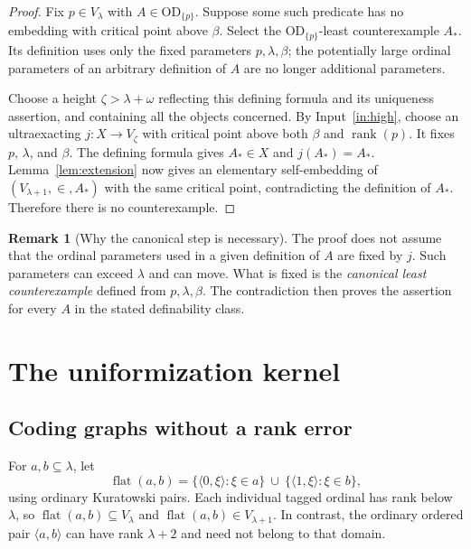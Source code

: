 \documentclass[11pt,letterpaper]{article}
\theoremstyle{definition}
\newtheorem{remark}[definition]{Remark}
\numberwithin{equation}{section}
\newcommand{\OD}{\mathrm{OD}}
\newcommand{\rank}{\operatorname{rank}}
\newcommand{\flatcode}[2]{\operatorname{flat}(#1,#2)}
\newcommand{\ODone}[1]{\OD_{\{#1\}}}
\begin{document}
\begin{proof}
Fix $p\in V_\lambda$ with $A\in\ODone{p}$. Suppose some such predicate has no embedding with critical point above $\beta$. Select the $\ODone{p}$-least counterexample $A_*$. Its definition uses only the fixed parameters $p,\lambda,\beta$; the potentially large ordinal parameters of an arbitrary definition of $A$ are no longer additional parameters.

Choose a height $\zeta>\lambda+\omega$ reflecting this defining formula and its uniqueness assertion, and containing all the objects concerned. By Input~\ref{in:high}, choose an ultraexacting $j:X\to V_\zeta$ with critical point above both $\beta$ and $\rank(p)$. It fixes $p$, $\lambda$, and $\beta$. The defining formula gives $A_*\in X$ and $j(A_*)=A_*$. Lemma~\ref{lem:extension} now gives an elementary self-embedding of $(V_{\lambda+1},\in,A_*)$ with the same critical point, contradicting the definition of $A_*$. Therefore there is no counterexample.
\end{proof}

\begin{remark}[Why the canonical step is necessary]
The proof does not assume that the ordinal parameters used in a given definition of $A$ are fixed by $j$. Such parameters can exceed $\lambda$ and can move. What is fixed is the \emph{canonical least counterexample} defined from $p,\lambda,\beta$. The contradiction then proves the assertion for every $A$ in the stated definability class.
\end{remark}

\section{The uniformization kernel}\label{sec:kernel}

\subsection{Coding graphs without a rank error}

For $a,b\subseteq\lambda$, let
\begin{equation}\label{eq:flat}
\flatcode{a}{b}=
\{\langle 0,\xi\rangle:\xi\in a\}
\ \cup\
\{\langle 1,\xi\rangle:\xi\in b\},
\end{equation}
using ordinary Kuratowski pairs. Each individual tagged ordinal has rank below $\lambda$, so $\flatcode{a}{b}\subseteq V_\lambda$ and $\flatcode{a}{b}\in V_{\lambda+1}$. In contrast, the ordinary ordered pair $\langle a,b\rangle$ can have rank $\lambda+2$ and need not belong to that domain.
\end{document}
